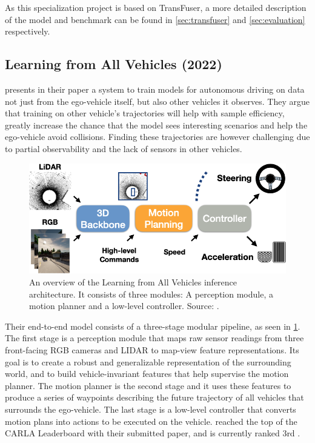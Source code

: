 As this specialization project is based on TransFuser, a more detailed description of the model and benchmark can be found in \cref{sec:transfuser} and \cref{sec:evaluation} respectively.


\subsection{Learning from All Vehicles (2022)}
\textcite{chen2022lav} presents in their paper a system to train models for autonomous driving on data not just from the ego-vehicle itself, but also other vehicles it observes.
They argue that training on other vehicle's trajectories will help with sample efficiency, greatly increase the chance that the model sees interesting scenarios and help the ego-vehicle avoid collisions. Finding these trajectories are however challenging due to partial observability and the lack of sensors in other vehicles.

\begin{figure}[htbp]
    \centering
    \includegraphics[width=.7\textwidth]{figures/2/lav.png}
    \caption{An overview of the Learning from All Vehicles inference architecture. It consists of three modules: A perception module, a motion planner and a low-level controller. Source: \cite{chen2022lav}.}
    \label{fig:lav}
\end{figure}

Their end-to-end model consists of a three-stage modular pipeline, as seen in \cref{fig:lav}. The first stage is a perception module that maps raw sensor readings from three front-facing RGB cameras and LIDAR to map-view feature representations. Its goal is to create a robust and generalizable representation of the surrounding world, and to build vehicle-invariant features that help supervise the motion planner. The motion planner is the second stage and it uses these features to produce a series of waypoints describing the future trajectory of all vehicles that surrounds the ego-vehicle. The last stage is a low-level controller that converts motion plans into actions to be executed on the vehicle. \textcite{chen2022lav} reached the top of the CARLA Leaderboard with their submitted paper, and is currently ranked 3rd \cite{chen2022lav, pwc-carla}.


